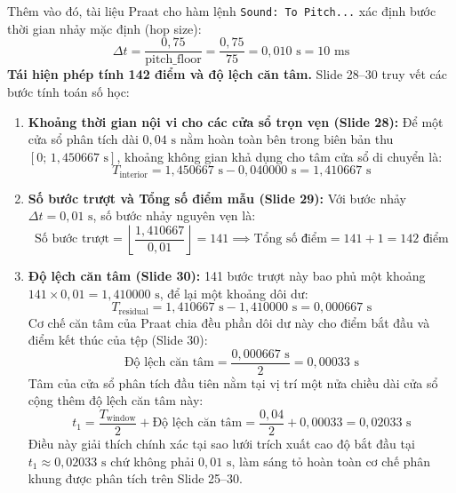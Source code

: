\documentclass[11pt,a4paper]{article}
\begin{document}
Thêm vào đó, tài liệu Praat cho hàm lệnh \texttt{Sound: To Pitch...} xác định bước thời gian nhảy mặc định (hop size):
\begin{equation}
\Delta t = \frac{0{,}75}{\text{pitch\_floor}} = \frac{0{,}75}{75} = 0{,}010\text{ s} = 10\text{ ms}
\end{equation}
\textbf{Tái hiện phép tính 142 điểm và độ lệch căn tâm.} Slide 28--30 truy vết các bước tính toán số học:
\begin{enumerate}
    \item \textbf{Khoảng thời gian nội vi cho các cửa sổ trọn vẹn (Slide 28):} Để một cửa sổ phân tích dài $0{,}04\text{ s}$ nằm hoàn toàn bên trong biên bản thu $[0;\, 1{,}450667\text{ s}]$, khoảng không gian khả dụng cho tâm cửa sổ di chuyển là:
    \begin{equation}
    T_{\text{interior}} = 1{,}450667\text{ s} - 0{,}040000\text{ s} = 1{,}410667\text{ s}
    \end{equation}
    \item \textbf{Số bước trượt và Tổng số điểm mẫu (Slide 29):} Với bước nhảy $\Delta t = 0{,}01\text{ s}$, số bước nhảy nguyên vẹn là:
    \begin{equation}
    \text{Số bước trượt} = \left\lfloor \frac{1{,}410667}{0{,}01} \right\rfloor = 141 \implies \text{Tổng số điểm} = 141 + 1 = 142\text{ điểm}
    \end{equation}
    \item \textbf{Độ lệch căn tâm (Slide 30):} 141 bước trượt này bao phủ một khoảng $141 \times 0{,}01 = 1{,}410000\text{ s}$, để lại một khoảng dôi dư:
    \begin{equation}
    T_{\text{residual}} = 1{,}410667\text{ s} - 1{,}410000\text{ s} = 0{,}000667\text{ s}
    \end{equation}
    Cơ chế căn tâm của Praat chia đều phần dôi dư này cho điểm bắt đầu và điểm kết thúc của tệp (Slide 30):
    \begin{equation}
    \text{Độ lệch căn tâm} = \frac{0{,}000667\text{ s}}{2} = 0{,}00033\text{ s}
    \end{equation}
    Tâm của cửa sổ phân tích đầu tiên nằm tại vị trí một nửa chiều dài cửa sổ cộng thêm độ lệch căn tâm này:
    \begin{equation}
    t_1 = \frac{T_{\text{window}}}{2} + \text{Độ lệch căn tâm} = \frac{0{,}04}{2} + 0{,}00033 = 0{,}02033\text{ s}
    \end{equation}
    Điều này giải thích chính xác tại sao lưới trích xuất cao độ bắt đầu tại $t_1 \approx 0{,}02033\text{ s}$ chứ không phải $0{,}01\text{ s}$, làm sáng tỏ hoàn toàn cơ chế phân khung được phân tích trên Slide 25--30.
\end{enumerate}
\end{document}
